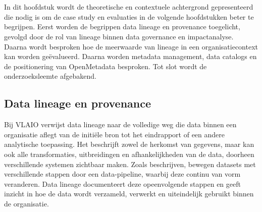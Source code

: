 \chapter{}%
\label{ch:stand-van-zaken}




In dit hoofdstuk wordt de theoretische en contextuele achtergrond gepresenteerd die nodig is om de case study en evaluaties in de volgende hoofdstukken beter te begrijpen. Eerst worden de begrippen data lineage en provenance toegelicht, gevolgd door de rol van lineage binnen data governance en impactanalyse. Daarna wordt besproken hoe de meerwaarde van lineage in een organisatiecontext kan worden geëvalueerd. Daarna worden metadata management, data catalogs en de positionering van OpenMetadata besproken. Tot slot wordt de onderzoeksleemte afgebakend.\\

\section{Data lineage en provenance}

Bij VLAIO verwijst data lineage naar de volledige weg die data binnen een organisatie aflegt van de initiële bron tot het eindrapport of een andere analytische toepassing. Het beschrijft zowel de herkomst van gegevens, maar kan ook alle transformaties, uitbreidingen en afhankelijkheden van de data, doorheen verschillende systemen zichtbaar maken. Zoals \textcite{verma2024tracing} beschrijven, bewegen datasets met verschillende stappen door een data-pipeline, waarbij deze continu van vorm veranderen. Data lineage documenteert deze opeenvolgende stappen en geeft inzicht in hoe de data wordt verzameld, verwerkt en uiteindelijk gebruikt binnen de organisatie.\\

